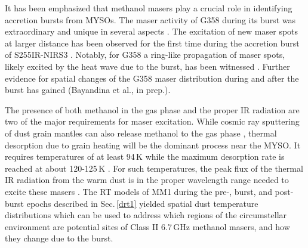 It has been emphasized that methanol masers play a crucial role in identifying accretion bursts from MYSOs. The maser activity of G358 during its burst was extraordinary and unique in several aspects \citep{2019ApJ...876L..25B, 2019ApJ...881L..39B, 2019MNRAS.489.3981M}.
The excitation of new maser spots at larger distance has been observed for the first time during the accretion burst of S255IR-NIRS3 \citep{2017A&A...600L...8M}. Notably, for G358 a ring-like propagation of maser spots, likely excited by the heat wave due to the burst, has been witnessed \citep{2020NatAs...4..506B}. Further evidence for spatial changes of the G358 maser distribution during and after the burst has gained
(Bayandina et al., in prep.). 

The presence of both methanol in the gas phase and the proper IR radiation are two of the major requirements for maser excitation. 
While cosmic ray sputtering of dust grain mantles can also release methanol to the gas phase \citep{2020A&A...634A.103D}, thermal desorption due to grain heating will be the dominant process near the MYSO. It 
requires temperatures of at least 94\,K \citep{2018MNRAS.473.1967L} while the maximum desorption rate is reached at about 120-125\,K \citep{2004MNRAS.354.1133C}. 
For such temperatures,
the peak flux of the thermal IR radiation from the warm dust is in the proper wavelength range needed to excite these masers \citep{2002IAUS..206..183O, 2005MNRAS.360..533C}. 
The RT models of MM1 during the pre-, burst, and post-burst epochs described in Sec.\,\ref{drt1} yielded spatial dust temperature distributions which can be used to address which regions of the circumstellar environment are potential sites of Class II 6.7\,GHz methanol masers, and how they change due to the burst.

